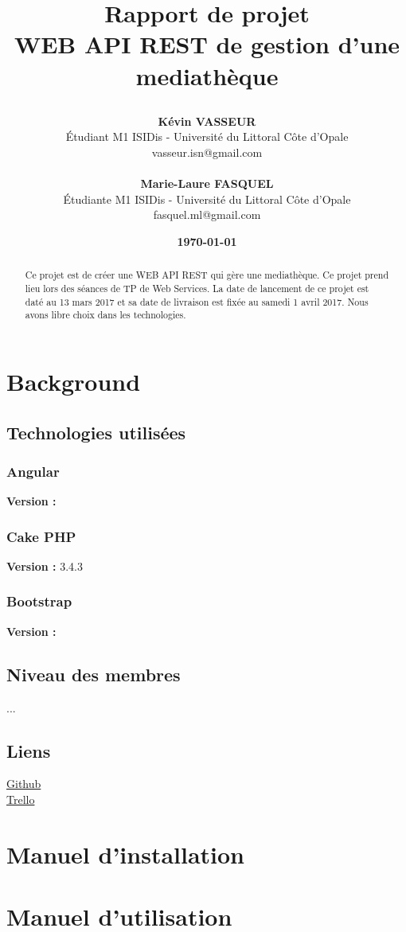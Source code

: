 \documentclass{report}
\title{%
    \begin{minipage}\linewidth
        \centering
        Rapport de projet\\
        \large WEB API REST de gestion d'une mediath\`{e}que
    \end{minipage}
}
\author{
	\textbf{K\'{e}vin VASSEUR} \\
	\'{E}tudiant M1 ISIDis - Universit\'{e} du Littoral C\^{o}te d'Opale\\
	vasseur.isn@gmail.com\\
	\\
	\textbf{Marie-Laure FASQUEL} \\
	\'{E}tudiante M1 ISIDis - Universit\'{e} du Littoral C\^{o}te d'Opale\\
	fasquel.ml@gmail.com\\
}
\date{\textbf{\today}}
\begin{document}
	\maketitle
	\begin{abstract}
		Ce projet est de cr\'{e}er une WEB API REST qui g\`{e}re une mediath\`{e}que. Ce projet prend lieu lors des s\'{e}ances de TP de Web Services. La date de lancement de ce projet est dat\'{e} au 13 mars 2017 et sa date de livraison est fix\'{e}e au samedi 1 avril 2017. Nous avons libre choix dans les technologies. \\
		
	\end{abstract}
	
	\tableofcontents	
	
	\chapter{Background}
	\section{Technologies utilis\'{e}es}
		\subsection{Angular}
		\textbf{Version :}  \\
		
		\subsection{Cake PHP}
		\textbf{Version :} 3.4.3 \\
		
		\subsection{Bootstrap}
		\textbf{Version :}  \\		
		
	\section{Niveau des membres}
		...
		
	\section{Liens}
		\href{https://github.com/kvasseur/webservices}{Github} \\
		\href{https://trello.com/b/A1vuuQZb/webservices-api-rest-mediatheque}{Trello}
	
	
	\chapter{Manuel d'installation}
	
	\chapter{Manuel d'utilisation}
		
	
	
	
\end{document}
